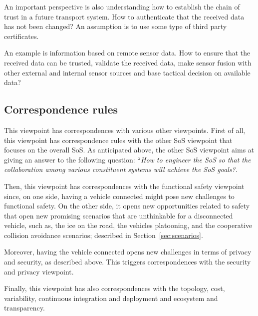 An important perspective is also understanding how to establish the chain of trust in a future transport system. How to authenticate that the received data has not been changed? An assumption is to use some type of third party certificates.

An example is information based on remote sensor data. How to ensure that the received data can be trusted, validate the received data, make sensor fusion with other external and internal sensor sources and base tactical decision on available data?


\subsection{Correspondence rules}

This viewpoint has correspondences with various other viewpoints. First of all, this viewpoint has correspondence rules with the other SoS viewpoint that focuses on the overall SoS. As anticipated above, the other SoS viewpoint aims at giving an answer to the following question: ``{\em How to engineer the SoS so that the collaboration among various constituent systems will achieve the SoS goals?}. 

Then, this viewpoint has correspondences with the functional safety viewpoint since, on one side, having a vehicle connected might pose new challenges to functional safety. On the other side, it opens new opportunities related to safety that open new promising scenarios that are unthinkable for a disconnected vehicle, such as, the ice on the road, the vehicles platooning, and the cooperative collision avoidance scenarios; described in Section~\ref{sec:scenarios}.

Moreover, having the vehicle connected opens new challenges in terms of privacy and security, as described above. This triggers correspondences with the security and privacy viewpoint.

Finally, this viewpoint has also correspondences with the topology, cost, variability, continuous integration and deployment and ecosystem and transparency.